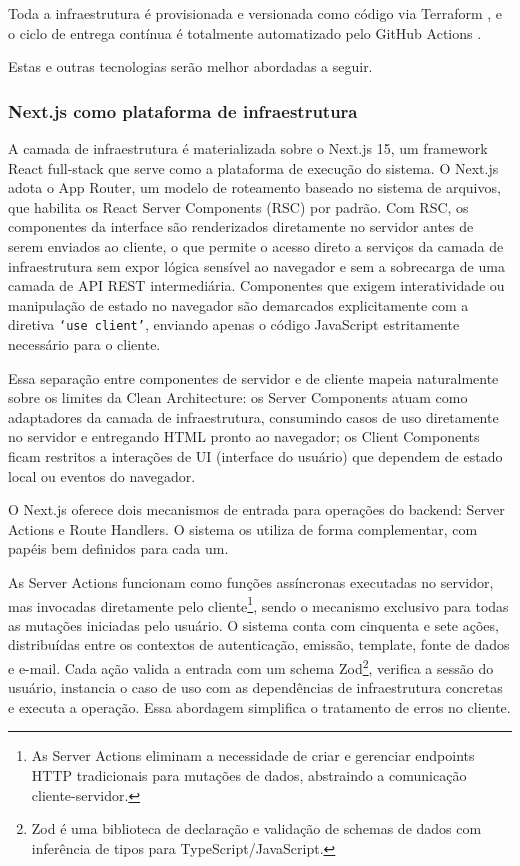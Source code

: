 \documentclass[article,a4paper,12pt,brazil,sumario=tradicional]{abntex2}
\begin{document}
Toda a infraestrutura é provisionada e versionada como código via Terraform \cite{terraform}, e o ciclo de entrega contínua é totalmente automatizado pelo GitHub Actions \cite{githubactions}.

Estas e outras tecnologias serão melhor abordadas a seguir.

\subsubsection{Next.js como plataforma de infraestrutura}

A camada de infraestrutura é materializada sobre o Next.js 15, um framework React full-stack que serve como a plataforma de execução do sistema. O Next.js adota o App Router, um modelo de roteamento baseado no sistema de arquivos, que habilita os React Server Components (RSC) por padrão. Com RSC, os componentes da interface são renderizados diretamente no servidor antes de serem enviados ao cliente, o que permite o acesso direto a serviços da camada de infraestrutura sem expor lógica sensível ao navegador e sem a sobrecarga de uma camada de API REST intermediária. Componentes que exigem interatividade ou manipulação de estado no navegador são demarcados explicitamente com a diretiva \texttt{`use client'}, enviando apenas o código JavaScript estritamente necessário para o cliente.

Essa separação entre componentes de servidor e de cliente mapeia naturalmente sobre os limites da Clean Architecture: os Server Components atuam como adaptadores da camada de infraestrutura, consumindo casos de uso diretamente no servidor e entregando HTML pronto ao navegador; os Client Components ficam restritos a interações de UI (interface do usuário) que dependem de estado local ou eventos do navegador.

O Next.js oferece dois mecanismos de entrada para operações do backend: Server Actions e Route Handlers. O sistema os utiliza de forma complementar, com papéis bem definidos para cada um.

As Server Actions funcionam como funções assíncronas executadas no servidor, mas invocadas diretamente pelo cliente\footnote{As Server Actions eliminam a necessidade de criar e gerenciar endpoints HTTP tradicionais para mutações de dados, abstraindo a comunicação cliente-servidor.}, sendo o mecanismo exclusivo para todas as mutações iniciadas pelo usuário. O sistema conta com cinquenta e sete ações, distribuídas entre os contextos de autenticação, emissão, template, fonte de dados e e-mail. Cada ação valida a entrada com um schema Zod\footnote{Zod é uma biblioteca de declaração e validação de schemas de dados com inferência de tipos para TypeScript/JavaScript.}, verifica a sessão do usuário, instancia o caso de uso com as dependências de infraestrutura concretas e executa a operação. Essa abordagem simplifica o tratamento de erros no cliente.
\end{document}
